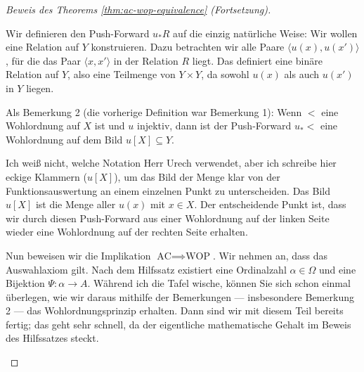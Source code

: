 \begin{proof}[Beweis des Theorems \ref{thm:ac-wop-equivalence} (Fortsetzung)]
\begin{spoken-clean}[01:00:00 - 01:01:59]
Wir definieren den Push-Forward $u_* R$ auf die einzig natürliche Weise: Wir wollen eine Relation auf $Y$ konstruieren. Dazu betrachten wir alle Paare $\langle u(x), u(x') \rangle$, für die das Paar $\langle x, x' \rangle$ in der Relation $R$ liegt. Das definiert eine binäre Relation auf $Y$, also eine Teilmenge von $Y \times Y$, da sowohl $u(x)$ als auch $u(x')$ in $Y$ liegen.

Als Bemerkung 2 (die vorherige Definition war Bemerkung 1): Wenn $<$ eine Wohlordnung auf $X$ ist und $u$ injektiv, dann ist der Push-Forward $u_* <$ eine Wohlordnung auf dem Bild $u[X] \subseteq Y$.

Ich weiß nicht, welche Notation Herr Urech verwendet, aber ich schreibe hier eckige Klammern ($u[X]$), um das Bild der Menge klar von der Funktionsauswertung an einem einzelnen Punkt zu unterscheiden. Das Bild $u[X]$ ist die Menge aller $u(x)$ mit $x \in X$. Der entscheidende Punkt ist, dass wir durch diesen Push-Forward aus einer Wohlordnung auf der linken Seite wieder eine Wohlordnung auf der rechten Seite erhalten.
\end{spoken-clean}

\begin{math-stroke}
\end{math-stroke}

\begin{spoken-clean}[01:01:59 - 01:03:41]
Nun beweisen wir die Implikation $\text{AC} \implies \text{WOP}$. Wir nehmen an, dass das Auswahlaxiom gilt. Nach dem Hilfssatz existiert eine Ordinalzahl $\alpha \in \Omega$ und eine Bijektion $\Psi \colon \alpha \to A$. Während ich die Tafel wische, können Sie sich schon einmal überlegen, wie wir daraus mithilfe der Bemerkungen --- insbesondere Bemerkung 2 --- das Wohlordnungsprinzip erhalten. Dann sind wir mit diesem Teil bereits fertig; das geht sehr schnell, da der eigentliche mathematische Gehalt im Beweis des Hilfssatzes steckt.


\end{spoken-clean}
\end{proof}
